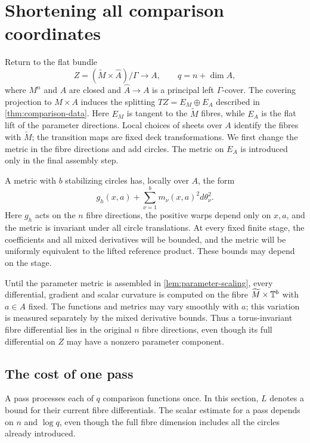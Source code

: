 \section{Shortening all comparison coordinates}
\label{sec:shortening}

Return to the flat bundle
\[
 Z=(\widetilde M\times\widehat A)/\Gamma\longrightarrow A,
 \qquad q=n+\dim A,
\]
where $M^n$ and $A$ are closed and $\widehat A\to A$ is a principal left
$\Gamma$-cover. The covering projection to $M\times A$ induces the splitting
$TZ=E_M\oplus E_A$ described in \cref{thm:comparison-data}. Here $E_M$ is
tangent to the $\widetilde M$ fibres, while $E_A$ is the flat lift of the
parameter directions. Local choices of sheets over $A$ identify the fibres
with $\widetilde M$; the transition maps are fixed deck transformations.
We first change the metric in the fibre directions and add circles. The
metric on $E_A$ is introduced only in the final assembly step.

A metric with $b$ stabilizing circles has, locally over $A$, the form
\begin{equation}\label{eq:fibre-stabilized-metric}
 g_h(x,a)+\sum_{\nu=1}^b m_\nu(x,a)^2d\theta_\nu^2.
\end{equation}
Here $g_h$ acts on the $n$ fibre directions, the positive warps depend only on $x,a$, and the metric is invariant under all circle translations. At every fixed finite stage, the coefficients and all mixed derivatives will be bounded, and the metric will be uniformly equivalent to the lifted reference product. These bounds may depend on the stage.

Until the parameter metric is assembled in
\cref{lem:parameter-scaling}, every differential, gradient and scalar
curvature is computed on the fibre $\widetilde M\times\mathbb T^b$ with
$a\in A$ fixed. The functions and metrics may vary smoothly with $a$;
this variation is measured separately by the mixed derivative bounds.
Thus a torus-invariant fibre differential lies in the original $n$
fibre directions, even though its full differential on $Z$ may
have a nonzero parameter component.

\subsection{The cost of one pass}

A pass processes each of $q$ comparison functions once. In this section,
$L$ denotes a bound for their current fibre differentials. The scalar
estimate for a pass depends on $n$ and $\log q$, even though the full fibre
dimension includes all the circles already introduced.


